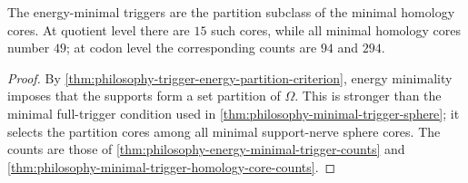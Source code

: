 \begin{corollary}
\label{cor:philosophy-energy-minimal-homology-core-subclass}
The energy-minimal triggers are the partition subclass of the minimal
homology cores. At quotient level there are $15$ such cores, while all
minimal homology cores number $49$; at codon level the corresponding
counts are $94$ and $294$.
\end{corollary}
\begin{proof}
By \autoref{thm:philosophy-trigger-energy-partition-criterion},
energy minimality imposes that the supports form a set partition of
$\Omega$. This is stronger than the minimal full-trigger condition used
in \autoref{thm:philosophy-minimal-trigger-sphere}; it selects the
partition cores among all minimal support-nerve sphere cores. The counts
are those of \autoref{thm:philosophy-energy-minimal-trigger-counts} and
\autoref{thm:philosophy-minimal-trigger-homology-core-counts}.
\end{proof}
